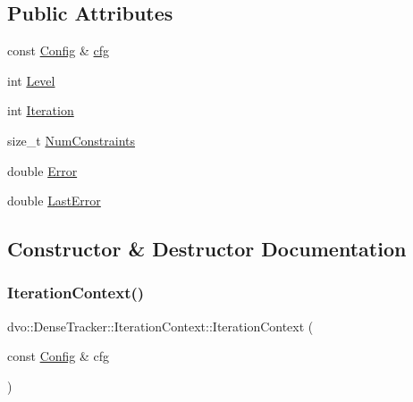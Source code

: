 \subsection*{Public Attributes}
\begin{DoxyCompactItemize}
\item 
const \mbox{\hyperlink{structdvo_1_1_dense_tracker_1_1_config}{Config}} \& \mbox{\hyperlink{structdvo_1_1_dense_tracker_1_1_iteration_context_a56d4fa3811b2b6d24243d2d0ea0d7348}{cfg}}
\item 
int \mbox{\hyperlink{structdvo_1_1_dense_tracker_1_1_iteration_context_a7efda75ce2066b72f0d7e94badb2d560}{Level}}
\item 
int \mbox{\hyperlink{structdvo_1_1_dense_tracker_1_1_iteration_context_afc12b998ec8732853a00ab396e20986d}{Iteration}}
\item 
size\+\_\+t \mbox{\hyperlink{structdvo_1_1_dense_tracker_1_1_iteration_context_a69908efda33537ec90b69af2bcf4d3a1}{Num\+Constraints}}
\item 
double \mbox{\hyperlink{structdvo_1_1_dense_tracker_1_1_iteration_context_acaa2799f500e5b1029ecd13d6a384baf}{Error}}
\item 
double \mbox{\hyperlink{structdvo_1_1_dense_tracker_1_1_iteration_context_aed3ead8aa09b40e80a7e58249ff3a54d}{Last\+Error}}
\end{DoxyCompactItemize}


\subsection{Constructor \& Destructor Documentation}
\mbox{\label{structdvo_1_1_dense_tracker_1_1_iteration_context_ab2e12923bbbc9b540cf8139d3a4d3f33}} 
\subsubsection{\texorpdfstring{Iteration\+Context()}{IterationContext()}}
{\footnotesize\ttfamily dvo\+::\+Dense\+Tracker\+::\+Iteration\+Context\+::\+Iteration\+Context (\begin{DoxyParamCaption}\item[{const \mbox{\hyperlink{structdvo_1_1_dense_tracker_1_1_config}{Config}} \&}]{cfg }\end{DoxyParamCaption})}



